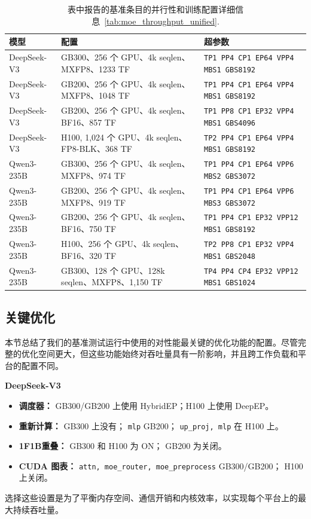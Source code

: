 \documentclass[10pt,logo,copyright]{nvidiatechreport_zh}
\begin{document}
\begin{table}[t]
\centering
\small
\caption{表中报告的基准条目的并行性和训练配置详细信息~\ref{tab:moe_throughput_unified}.}
\label{tab:appendix_showcase_configs}
\begin{tabular}{lll}
\toprule
模型 & 配置 & 超参数 \\
\midrule
DeepSeek-V3 & GB300、256 个 GPU、4k seqlen、MXFP8、1233 TF      & \texttt{TP1 PP4 CP1 EP64 VPP4 MBS1 GBS8192} \\
DeepSeek-V3 & GB200、256 个 GPU、4k seqlen、MXFP8、1048 TF      & \texttt{TP1 PP4 CP1 EP64 VPP4 MBS1 GBS8192} \\
DeepSeek-V3 & GB200、256 个 GPU、4k seqlen、BF16、857 TF        & \texttt{TP1 PP8 CP1 EP32 VPP4 MBS1 GBS4096} \\
DeepSeek-V3 & H100, 1{,}024 个 GPU、4k seqlen、FP8-BLK、368 TF  & \texttt{TP2 PP4 CP1 EP64 VPP4 MBS1 GBS8192} \\
\midrule
Qwen3-235B & GB300、256 个 GPU、4k seqlen、MXFP8、974 TF        & \texttt{TP1 PP4 CP1 EP64 VPP\phantom{0}6 MBS2 GBS3072} \\
Qwen3-235B & GB200、256 个 GPU、4k seqlen、MXFP8、919 TF        & \texttt{TP1 PP4 CP1 EP64 VPP\phantom{0}6 MBS3 GBS3072} \\
Qwen3-235B & GB200、256 个 GPU、4k seqlen、BF16、750 TF         & \texttt{TP1 PP4 CP1 EP32 VPP12 MBS1 GBS8192} \\
Qwen3-235B & H100、256 个 GPU、4k seqlen、BF16、320 TF          & \texttt{TP2 PP8 CP1 EP32 VPP\phantom{0}4 MBS1 GBS2048} \\
\midrule
Qwen3-235B & GB300、128 个 GPU、128k seqlen、MXFP8、1{,}150 TF    & \texttt{TP4 PP4 CP4 EP32 VPP12 MBS1 GBS1024} \\
\bottomrule
\end{tabular}
\end{table}

\subsection{关键优化} 
本节总结了我们的基准测试运行中使用的对性能最关键的优化功能的配置。尽管完整的优化空间更大，但这些功能始终对吞吐量具有一阶影响，并且跨工作负载和平台的配置不同。

\textbf{DeepSeek-V3}
\begin{itemize}[noitemsep,topsep=0pt]
    \item \textbf{调度器：} GB300/GB200 上使用 HybridEP；H100 上使用 DeepEP。
    \item \textbf{重新计算：} GB300 上没有； \texttt{mlp} GB200； \texttt{up\_proj, mlp} 在 H100 上。
    \item \textbf{1F1B重叠：} GB300 和 H100 为 ON； GB200 为关闭。
    \item \textbf{CUDA 图表：} \texttt{attn, moe\_router, moe\_preprocess} GB300/GB200； H100 上关闭。
\end{itemize}
选择这些设置是为了平衡内存空间、通信开销和内核效率，以实现每个平台上的最大持续吞吐量。
\end{document}
